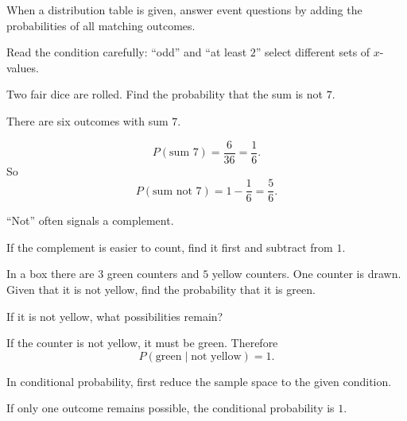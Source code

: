 \begin{takeaways}
\item When a distribution table is given, answer event questions by adding the probabilities of all matching outcomes.
\item Read the condition carefully: ``odd'' and ``at least $2$'' select different sets of $x$-values.
\end{takeaways}

\begin{problem}
Two fair dice are rolled. Find the probability that the sum is not $7$.
\end{problem}

\begin{hint}
There are six outcomes with sum $7$.
\end{hint}

\begin{solution}
\[
P(\text{sum }7)=\frac6{36}=\frac16.
\]
So
\[
P(\text{sum not }7)=1-\frac16=\frac56.
\]
\end{solution}

\begin{takeaways}
\item ``Not'' often signals a complement.
\item If the complement is easier to count, find it first and subtract from $1$.
\end{takeaways}

\begin{problem}
In a box there are $3$ green counters and $5$ yellow counters. One counter is drawn. Given that it is not yellow, find the probability that it is green.
\end{problem}

\begin{hint}
If it is not yellow, what possibilities remain?
\end{hint}

\begin{solution}
If the counter is not yellow, it must be green. Therefore
\[
P(\text{green}\mid \text{not yellow})=1.
\]
\end{solution}

\begin{takeaways}
\item In conditional probability, first reduce the sample space to the given condition.
\item If only one outcome remains possible, the conditional probability is $1$.
\end{takeaways}

